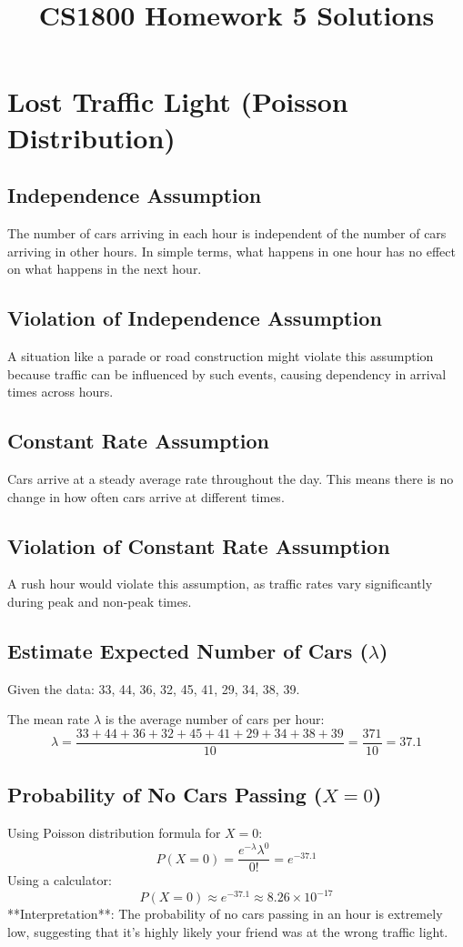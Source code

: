 \documentclass{article}
\title{CS1800 Homework 5 Solutions}
\author{}
\date{}
\begin{document}
\maketitle
\newpage

\section{Lost Traffic Light (Poisson Distribution)}

\subsection{Independence Assumption}
The number of cars arriving in each hour is independent of the number of cars arriving in other hours. In simple terms, what happens in one hour has no effect on what happens in the next hour.

\subsection{Violation of Independence Assumption}
A situation like a parade or road construction might violate this assumption because traffic can be influenced by such events, causing dependency in arrival times across hours.

\subsection{Constant Rate Assumption}
Cars arrive at a steady average rate throughout the day. This means there is no change in how often cars arrive at different times.

\subsection{Violation of Constant Rate Assumption}
A rush hour would violate this assumption, as traffic rates vary significantly during peak and non-peak times.

\subsection{Estimate Expected Number of Cars (\( \lambda \))}
Given the data: 33, 44, 36, 32, 45, 41, 29, 34, 38, 39.

The mean rate \( \lambda \) is the average number of cars per hour:
\[
\lambda = \frac{33 + 44 + 36 + 32 + 45 + 41 + 29 + 34 + 38 + 39}{10} = \frac{371}{10} = 37.1
\]

\subsection{Probability of No Cars Passing (\( X = 0 \))}
Using Poisson distribution formula for \( X = 0 \):
\[
P(X = 0) = \frac{e^{-\lambda} \lambda^0}{0!} = e^{-37.1}
\]
Using a calculator:
\[
P(X = 0) \approx e^{-37.1} \approx 8.26 \times 10^{-17}
\]
**Interpretation**: The probability of no cars passing in an hour is extremely low, suggesting that it’s highly likely your friend was at the wrong traffic light.
\end{document}
